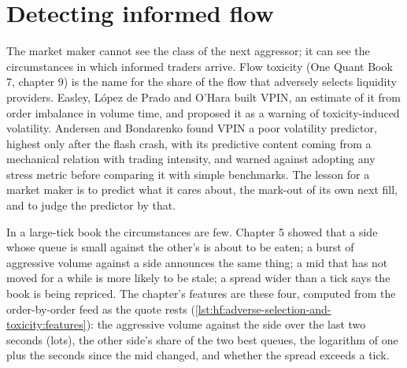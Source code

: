 \begin{omfigure}

\label{fig:hf:adverse-selection-and-toxicity:classes}
\end{omfigure}

\section{Detecting informed flow}

The market maker cannot see the class of the next aggressor; it can see the circumstances in which informed traders arrive. Flow toxicity (One
Quant Book 7, chapter 9) is the name for the share of the flow that adversely selects liquidity providers. Easley, López de Prado and O'Hara built
VPIN, an estimate of it from order imbalance in volume time, and proposed it as a warning of toxicity-induced volatility. Andersen and Bondarenko
found VPIN a poor volatility predictor, highest only after the flash crash, with its predictive content coming from a mechanical relation with
trading intensity, and warned against adopting any stress metric before comparing it with simple benchmarks. The lesson for a market maker is to
predict what it cares about, the mark-out of its own next fill, and to judge the predictor by that.

In a large-tick book the circumstances are few. Chapter 5 showed that a side whose queue is small against the other's is about to be eaten; a
burst of aggressive volume against a side announces the same thing; a mid that has not moved for a while is more likely to be stale; a spread wider
than a tick says the book is being repriced. The chapter's features are these four, computed from the order-by-order feed as the quote rests
(\cref{lst:hf:adverse-selection-and-toxicity:features}): the aggressive volume against the side over the last two seconds (lots), the other side's
share of the two best queues, the logarithm of one plus the seconds since the mid changed, and whether the spread exceeds a tick.

